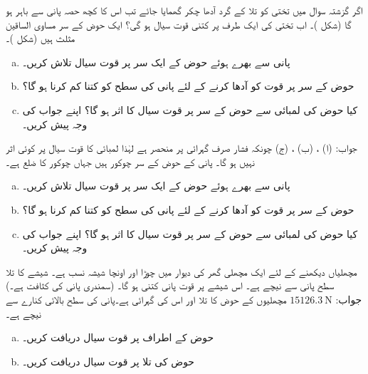اگر گزشتہ سوال میں تختی کو تلا کے گرد آدھا چکر گھمایا جائے تب اس کا کچھ حصہ پانی سے باہر ہو گا (شکل )۔ اب تختی کی ایک طرف پر کتنی قوت سیال ہو گی؟ 
ایک حوض کے  سر مساوی الساقین مثلث ہیں (شکل )۔
\begin{enumerate}[a.]
\item
 پانی سے بھرے ہوئے حوض کے ایک سر پر قوت سیال تلاش کریں۔
\item
حوض کے سر پر قوت کو آدھا کرنے کے لئے پانی کی سطح کو کتنا کم کرنا ہو گا؟
\item
کیا حوض کی لمبائی سے حوض کے سر پر قوت سیال کا اثر ہو گا؟ اپنے جواب کی وجہ پیش کریں۔
\end{enumerate}
جواب:\quad
(ا) ، (ب) ، (ج) چونکہ فشار صرف گہرائی پر منحصر ہے لہٰذا لمبائی کا قوت سیال پر کوئی اثر نہیں ہو گا۔
پانی کے حوض کے سر چوکور ہیں جہاں چوکور کا ضلع  ہے۔ 
\begin{enumerate}[a.]
\item
 پانی سے بھرے ہوئے حوض کے ایک سر پر قوت سیال تلاش کریں۔
\item
حوض کے سر پر قوت کو آدھا کرنے کے لئے پانی کی سطح کو کتنا کم کرنا ہو گا؟
\item
کیا حوض کی لمبائی سے حوض کے سر پر قوت سیال کا اثر ہو گا؟ اپنے جواب کی وجہ پیش کریں۔
\end{enumerate}
مچھلیاں دیکھنے کے لئے ایک مچھلی گھر کی دیوار میں  چوڑا اور  اونچا شیشہ نسب ہے۔ شیشے کا تلا   سطح پانی سے  نیچے ہے۔ اس شیشے پر قوت پانی کتنی ہو گا۔ (سمندری پانی کی کثافت  ہے۔)\\
جواب:\quad
$\SI{15126.3}{\newton}$
مچھلیوں کے حوض کا تلا  اور اس کی گہرائی  ہے۔پانی کی سطح بالائی کنارے سے  نیچے ہے۔
\begin{enumerate}[a.]
\item
حوض کے اطراف پر قوت سیال دریافت کریں۔
\item
حوض کی تلا پر قوت سیال دریافت کریں۔
\end{enumerate}
